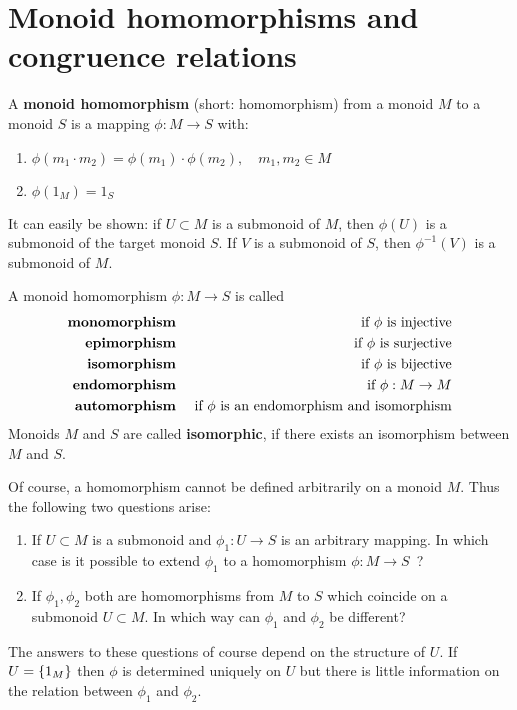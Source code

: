 \section{Monoid homomorphisms and congruence relations}

\begin{definition}
A {\bf monoid homomorphism} (short: homomorphism) from a monoid $M$ to a monoid
$S$ is a mapping $\phi : M \to S$ with:
\begin{enumerate}
  \item $\phi(m_1 \cdot m_2) = \phi(m_1) \cdot \phi(m_2), \quad m_1, m_2 \in M$
  \item $\phi(1_M) = 1_S$
\end{enumerate}
\end{definition}

It can easily be shown: if $U \subset M$ is a submonoid of $M$, then
$\phi(U)$ is a submonoid of the target monoid $S$. If $V$ is a submonoid of $S$,
then $\phi^{-1}(V)$ is a submonoid of $M$.

A monoid homomorphism $\phi: M \to S$ is called
\begin{eqnarray*}
\text{\bf monomorphism} & & \text{ if $\phi$ is injective} \\
\text{\bf epimorphism} & & \text{ if $\phi$ is surjective} \\
\text{\bf isomorphism} & & \text{ if $\phi$ is bijective} \\
\text{\bf endomorphism} & & \text{ if $\phi: M\to M$} \\
\text{\bf automorphism} & & \text{ if $\phi$ is an endomorphism and isomorphism}
\end{eqnarray*}
Monoids $M$ and $S$ are called {\bf isomorphic}, if there exists an
isomorphism between $M$ and $S$.

Of course, a homomorphism cannot be defined arbitrarily on a monoid $M$.
Thus the following two questions arise:
\begin{enumerate}
  \item If $U \subset M$ is a submonoid and $\phi_1 : U \to S$ is an arbitrary
mapping. In which case is it possible to extend $\phi_1$ to a homomorphism $\phi
: M \to S$\ ?
	\item If $\phi_1, \phi_2$ both are homomorphisms from $M$ to $S$ which
	coincide on a submonoid $U \subset M$. In which way can $\phi_1$ and $\phi_2$
	be different? 
\end{enumerate}

The answers to these questions of course depend on the structure of $U$. If
$U = \mbox{$\{1_M\}$}$ then $\phi$ is determined uniquely on $U$ but there is
little information on the relation between $\phi_1$ and $\phi_2$.

